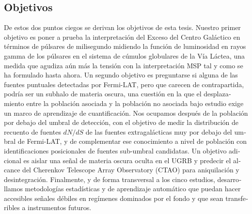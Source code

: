 \begin{otherlanguage}{spanish}
\section*{Objetivos}
De estos dos puntos ciegos se derivan los objetivos de esta tesis. Nuestro primer objetivo es poner a prueba la interpretación del Exceso del Centro Galáctico en términos de púlsares de milisegundo midiendo la función de luminosidad en rayos gamma de los púlsares en el sistema de cúmulos globulares de la Vía Láctea, una medida que agudiza aún más la tensión con la interpretación MSP tal y como se ha formulado hasta ahora. Un segundo objetivo es preguntarse si alguna de las fuentes puntuales detectadas por Fermi-LAT, pero que carecen de contrapartida, podría ser un subhalo de materia oscura, una cuestión en la que el desplazamiento entre la población asociada y la población no asociada bajo estudio exige un marco de aprendizaje de cuantificación. Nos ocupamos después de la población por debajo del umbral de detección, con el objetivo de medir la distribución de recuento de fuentes $dN/dS$ de las fuentes extragalácticas muy por debajo del umbral de Fermi-LAT, y de complementar ese conocimiento a nivel de población con identificaciones posicionales de fuentes sub-umbral candidatas. Un objetivo adicional es aislar una señal de materia oscura oculta en el UGRB y predecir el alcance del Cherenkov Telescope Array Observatory (CTAO) para aniquilación y desintegración. Finalmente, y de forma transversal a los cinco estudios, desarrollamos metodologías estadísticas y de aprendizaje automático que puedan hacer accesibles señales débiles en regímenes dominados por el fondo y que sean transferibles a instrumentos futuros.


\end{otherlanguage}

